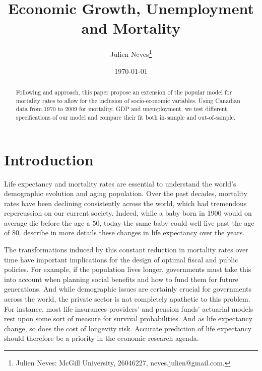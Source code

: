 \documentclass[AER, draftmode]{AEA}
\begin{document}
\title{Economic Growth, Unemployment and Mortality}
\author{Julien Neves\thanks{Julien Neves: McGill University, 26046227, neves.julien@gmail.com.}}
\date{\today}

\begin{abstract}
Following \cite{Niu2014} and \cite{Brouhns2002} approach, this paper propose an extension of the popular \cite{Lee1992} model for mortality rates to allow for the inclusion of socio-economic variables. Using Canadian data from 1970 to 2009 for mortality, GDP and unemployment, we test different specifications of our model and compare their fit both in-sample and out-of-sample.
\end{abstract}

\maketitle

\section{Introduction}\label{sec:intro}


Life expectancy and mortality rates are essential to understand the world's demographic evolution and aging population. Over the past decades, mortality rates have been declining consistently across the world, which had tremendous repercussion on our current society. Indeed, while a baby born in 1900 would on average die before the age a 50, today the same baby could well live past the age of 80. \cite{Pitacco2009} describe in more details these changes in life expectancy over the years.

The transformations induced by this constant reduction in mortality rates over time have important implications for the design of optimal fiscal and public policies. For example, if the population lives longer, governments must take this into account when planning social benefits and how to fund them for future generations. And while demographic issues are certainly crucial for governments across the world, the private sector is not completely apathetic to this problem. For instance, most life insurances providers' and pension funds' actuarial models rest upon some sort of measure for survival probabilities. And as life expectancy change, so does the cost of longevity risk. Accurate prediction of life expectancy should therefore be a priority in the economic research agenda. 
\end{document}
